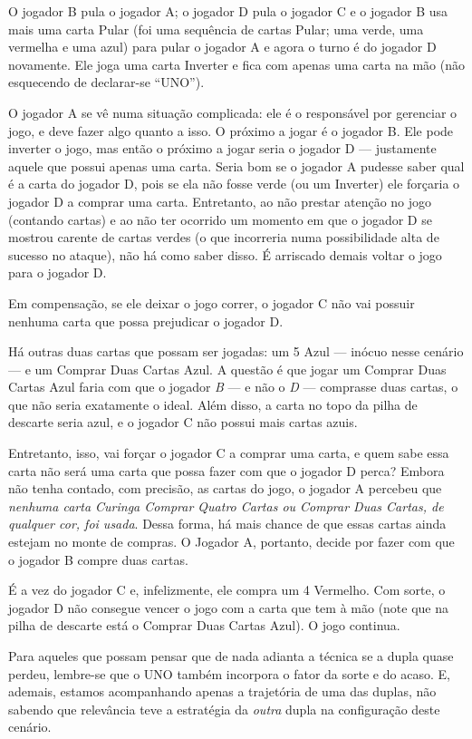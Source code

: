 O jogador B pula o jogador A; o jogador D pula o jogador C e o jogador B usa mais uma carta Pular (foi uma sequência de cartas Pular; uma verde, uma vermelha e uma azul) para pular o jogador A e agora o turno é do jogador D novamente. Ele joga uma carta Inverter e fica com apenas uma carta na mão (não esquecendo de declarar-se ``UNO'').

O jogador A se vê numa situação complicada: ele é o responsável por gerenciar o jogo, e deve fazer algo quanto a isso. O próximo a jogar é o jogador B. Ele pode inverter o jogo, mas então o próximo a jogar seria o jogador D --- justamente aquele que possui apenas uma carta. Seria bom se o jogador A pudesse saber qual é a carta do jogador D, pois se ela não fosse verde (ou um Inverter) ele forçaria o jogador D a comprar uma carta. Entretanto, ao não prestar atenção no jogo (contando cartas) e ao não ter ocorrido um momento em que o jogador D se mostrou carente de cartas verdes (o que incorreria numa possibilidade alta de sucesso no ataque), não há como saber disso. É arriscado demais voltar o jogo para o jogador D.

Em compensação, se ele deixar o jogo correr, o jogador C não vai possuir nenhuma carta que possa prejudicar o jogador D.

Há outras duas cartas que possam ser jogadas: um 5 Azul --- inócuo nesse cenário --- e um Comprar Duas Cartas Azul. A questão é que jogar um Comprar Duas Cartas Azul faria com que o jogador \emph{B} --- e não o \emph{D} --- comprasse duas cartas, o que não seria exatamente o ideal. Além disso, a carta no topo da pilha de descarte seria azul, e o jogador C não possui mais cartas azuis.

Entretanto, isso, vai forçar o jogador C a comprar uma carta, e quem sabe essa carta não será uma carta que possa fazer com que o jogador D perca? Embora não tenha contado, com precisão, as cartas do jogo, o jogador A percebeu que \emph{nenhuma carta Curinga Comprar Quatro Cartas ou Comprar Duas Cartas, de qualquer cor, foi usada}. Dessa forma, há mais chance de que essas cartas ainda estejam no monte de compras. O Jogador A, portanto, decide por fazer com que o jogador B compre duas cartas.

É a vez do jogador C e, infelizmente, ele compra um 4 Vermelho. Com sorte, o jogador D não consegue vencer o jogo com a carta que tem à mão (note que na pilha de descarte está o Comprar Duas Cartas Azul). O jogo continua.

Para aqueles que possam pensar que de nada adianta a técnica se a dupla quase perdeu, lembre-se que o UNO também incorpora o fator da sorte e do acaso. E, ademais, estamos acompanhando apenas a trajetória de uma das duplas, não sabendo que relevância teve a estratégia da \emph{outra} dupla na configuração deste cenário.


